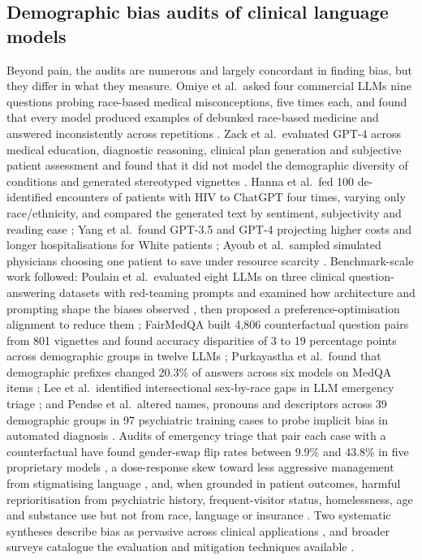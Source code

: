 \subsection{Demographic bias audits of clinical language models}
Beyond pain, the audits are numerous and largely concordant in finding bias,
but they differ in what they measure. Omiye et al.\ asked four commercial LLMs
nine questions probing race-based medical misconceptions, five times each, and
found that every model produced examples of debunked race-based medicine and
answered inconsistently across repetitions \cite{omiye2023race}. Zack et al.\
evaluated GPT-4 across medical education, diagnostic reasoning, clinical plan
generation and subjective patient assessment and found that it did not model the
demographic diversity of conditions and generated stereotyped vignettes
\cite{zack2024gpt4}. Hanna et al.\ fed 100 de-identified encounters of patients
with HIV to ChatGPT four times, varying only race/ethnicity, and compared the
generated text by sentiment, subjectivity and reading ease
\cite{hanna2023assessing}; Yang et al.\ found GPT-3.5 and GPT-4 projecting higher
costs and longer hospitalisations for White patients \cite{yang2024unmasking};
Ayoub et al.\ sampled simulated physicians choosing one patient to save under
resource scarcity \cite{ayoub2024inherent}. Benchmark-scale work followed:
Poulain et al.\ evaluated eight LLMs on three clinical question-answering
datasets with red-teaming prompts and examined how architecture and prompting
shape the biases observed \cite{poulain2024bias}, then proposed a
preference-optimisation alignment to reduce them \cite{poulain2024aligning};
FairMedQA built 4,806 counterfactual question pairs from 801 vignettes and found
accuracy disparities of 3 to 19 percentage points across demographic groups in
twelve LLMs \cite{xiao2025fairmedqa}; Purkayastha et al.\ found that
demographic prefixes changed 20.3\% of answers across six models on MedQA items
\cite{purkayastha2026beyond}; Lee et al.\ identified intersectional sex-by-race
gaps in LLM emergency triage \cite{lee2026promising}; and Pendse et al.\ altered
names, pronouns and descriptors across 39 demographic groups in 97 psychiatric
training cases to probe implicit bias in automated diagnosis
\cite{pendse2026implicit}. Audits of emergency triage that pair each case with
a counterfactual have found gender-swap flip rates between 9.9\% and 43.8\% in
five proprietary models \cite{young2026equitriage}, a dose-response skew toward
less aggressive management from stigmatising language
\cite{huang2026artificial}, and, when grounded in patient outcomes, harmful
reprioritisation from psychiatric history, frequent-visitor status, homelessness,
age and substance use but not from race, language or insurance
\cite{jarrett2026outcome}. Two systematic syntheses describe bias as pervasive
across clinical applications \cite{suenghataiphorn2025systematic,
xiao2026scoping}, and broader surveys catalogue the evaluation and mitigation
techniques available \cite{gallegos2024bias, mittermaier2023bias}.

